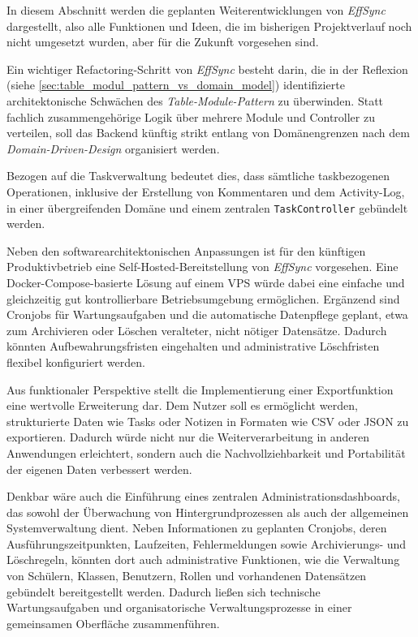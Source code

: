 \label{ch:ausblicke}
In diesem Abschnitt werden die geplanten Weiterentwicklungen von \textit{EffSync} dargestellt, also alle Funktionen und Ideen, die im bisherigen Projektverlauf noch nicht umgesetzt wurden, aber für die Zukunft vorgesehen sind.

\label{sec:ausblick_refactoring_backend}
Ein wichtiger Refactoring-Schritt von \textit{EffSync} besteht darin, die in der Reflexion (siehe \autoref{sec:table_modul_pattern_vs_domain_model}) identifizierte architektonische Schwächen des \textit{Table-Module-Pattern} zu überwinden. Statt fachlich zusammengehörige Logik über mehrere Module und Controller zu verteilen, soll das Backend künftig strikt entlang von Domänengrenzen nach dem \textit{Domain-Driven-Design} organisiert werden.

Bezogen auf die Taskverwaltung bedeutet dies, dass sämtliche taskbezogenen Operationen, inklusive der Erstellung von Kommentaren und dem Activity-Log, in einer übergreifenden Domäne und einem zentralen \texttt{TaskController} gebündelt werden. 

\label{sec:deployment_outlook}
Neben den softwarearchitektonischen Anpassungen ist für den künftigen Produktivbetrieb eine Self-Hosted-Bereitstellung von \textit{EffSync} vorgesehen. Eine Docker-Compose-basierte Lösung auf einem \gls{VPS} würde dabei eine einfache und gleichzeitig gut kontrollierbare Betriebsumgebung ermöglichen. Ergänzend sind Cronjobs für Wartungsaufgaben und die automatische Datenpflege geplant, etwa zum Archivieren oder Löschen veralteter, nicht nötiger Datensätze. Dadurch könnten Aufbewahrungsfristen eingehalten und administrative Löschfristen flexibel konfiguriert werden.

\label{sec:datenexport_admindashboard}
Aus funktionaler Perspektive stellt die Implementierung einer Exportfunktion eine wertvolle Erweiterung dar. Dem Nutzer soll es ermöglicht werden, strukturierte Daten wie Tasks oder Notizen in Formaten wie CSV oder JSON zu exportieren. Dadurch würde nicht nur die Weiterverarbeitung in anderen Anwendungen erleichtert, sondern auch die Nachvollziehbarkeit und Portabilität der eigenen Daten verbessert werden.

Denkbar wäre auch die Einführung eines zentralen Administrationsdashboards, das sowohl der Überwachung von Hintergrundprozessen als auch der allgemeinen Systemverwaltung dient. Neben Informationen zu geplanten Cronjobs, deren Ausführungszeitpunkten, Laufzeiten, Fehlermeldungen sowie Archivierungs- und Löschregeln, könnten dort auch administrative Funktionen, wie die Verwaltung von Schülern, Klassen, Benutzern, Rollen und vorhandenen Datensätzen gebündelt bereitgestellt werden. Dadurch ließen sich technische Wartungsaufgaben und organisatorische Verwaltungsprozesse in einer gemeinsamen Oberfläche zusammenführen.


